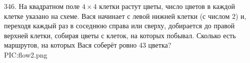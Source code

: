 346. На квадратном поле $4\times4$ клетки растут цветы, число цветов в каждой клетке указано на схеме. Вася начинает с левой нижней клетки (с числом 2) и, переходя каждый раз в соседнюю справа или сверху, добирается до правой верхней клетки, собирая цветы с клеток, на которых побывал. Сколько есть маршрутов, на которых Вася соберёт ровно 43 цветка?\\
{{PIC:flow2.png}}\\
